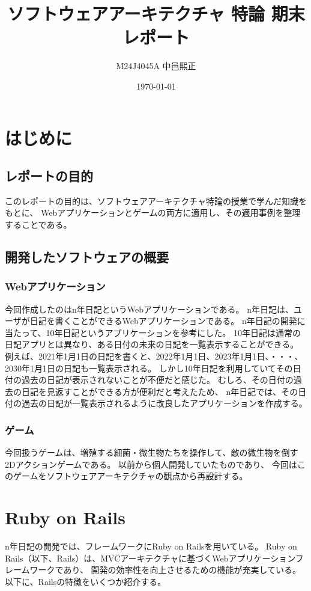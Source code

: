\documentclass[dvipdfmx,fleqn,article]{jlreq}
\title{ソフトウェアアーキテクチャ 特論 期末レポート}
\author{M24J4045A 中邑熙正}
\date{\today}
\begin{document}
\thispagestyle{empty} %
\maketitle
\newpage

\tableofcontents
\newpage



\section{はじめに}
\subsection{レポートの目的}
このレポートの目的は、ソフトウェアアーキテクチャ特論の授業で学んだ知識をもとに、
Webアプリケーションとゲームの両方に適用し、その適用事例を整理することである。
\subsection{開発したソフトウェアの概要}
\subsubsection{Webアプリケーション}
今回作成したのはn年日記というWebアプリケーションである。
n年日記は、ユーザが日記を書くことができるWebアプリケーションである。
n年日記の開発に当たって、10年日記\cite{website1}というアプリケーションを参考にした。
10年日記は通常の日記アプリとは異なり、ある日付の未来の日記を一覧表示することができる。
例えば、2021年1月1日の日記を書くと、2022年1月1日、2023年1月1日、・・・、
2030年1月1日の日記も一覧表示される。
しかし10年日記を利用していてその日付の過去の日記が表示されないことが不便だと感じた。
むしろ、その日付の過去の日記を見返すことができる方が便利だと考えたため、
n年日記では、その日付の過去の日記が一覧表示されるように改良したアプリケーションを作成する。

\subsubsection{ゲーム}
今回扱うゲームは、増殖する細菌・微生物たちを操作して、敵の微生物を倒す2Dアクションゲームである。
以前から個人開発していたものであり、
今回はこのゲームをソフトウェアアーキテクチャの観点から再設計する。

\section{Ruby on Rails}
n年日記の開発では、フレームワークにRuby on Railsを用いている。
Ruby on Rails（以下、Rails）は、MVCアーキテクチャに基づくWebアプリケーションフレームワークであり、
開発の効率性を向上させるための機能が充実している。
以下に、Railsの特徴をいくつか紹介する。
\end{document}
